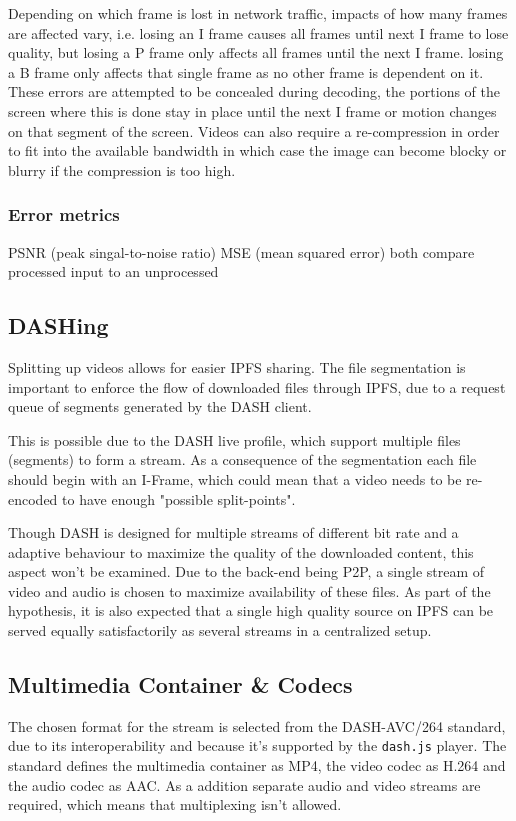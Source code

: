 Depending on which frame is lost in network traffic, impacts of how many frames are affected vary, i.e. losing an I frame causes all frames until next I frame to lose quality, but losing a P frame only affects all frames until the next I frame. losing a B frame only affects that single frame as no other frame is dependent on it.\\
These errors are attempted to be concealed during decoding, the portions of the screen where this is done stay in place until the next I frame or motion changes on that segment of the screen. Videos can also require a re-compression in order to fit into the available bandwidth in which case the image can become blocky or blurry if the compression is too high.

\subsubsection{Error metrics}
PSNR (peak singal-to-noise ratio) MSE (mean squared error) both compare processed input to an unprocessed

\subsection{DASHing}
Splitting up videos allows for easier \acs{IPFS} sharing. The file segmentation is important to enforce the flow of downloaded files through IPFS, due to a request queue of segments generated by the DASH client.

This is possible due to the DASH live profile, which support multiple files (segments) to form a stream. As a consequence of the segmentation each file should begin with an I-Frame, which could mean that a video needs to be re-encoded to have enough "possible split-points".

Though DASH is designed for multiple streams of different bit rate and a adaptive behaviour to maximize the quality of the downloaded content, this aspect won't be examined. Due to the back-end being \acs{P2P}, a single stream of video and audio is chosen to maximize availability of these files. As part of the hypothesis, it is also expected that a single high quality source on IPFS can be served equally satisfactorily as several streams in a centralized setup.

\subsection{Multimedia Container \& Codecs}
The chosen format for the stream is selected from the DASH-AVC/264 standard\cite{dash264}, due to its interoperability and because it's supported by the \texttt{dash.js} player.
The standard defines the multimedia container as MP4, the video codec as H.264 and the audio codec as AAC. As a addition separate audio and video streams are required, which means that multiplexing isn't allowed.



